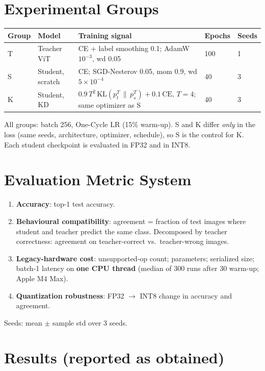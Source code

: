 \documentclass[11pt]{article}
\begin{document}
\section{Experimental Groups}
\begin{center}\small\begin{tabular}{llp{7.6cm}ll}\toprule
Group & Model & Training signal & Epochs & Seeds\\\midrule
T & Teacher ViT & CE + label smoothing 0.1; AdamW $10^{-3}$, wd 0.05 & 100 & 1\\
S & Student, scratch & CE; SGD-Nesterov 0.05, mom 0.9, wd $5\!\times\!10^{-4}$ & 40 & 3\\
K & Student, KD & $0.9\,T^2\,\mathrm{KL}(p_t^{T}\,\|\,p_s^{T}) + 0.1\,\mathrm{CE}$, $T=4$; same optimizer as S & 40 & 3\\\bottomrule
\end{tabular}\end{center}
All groups: batch 256, One-Cycle LR (15\% warm-up). S and K differ \emph{only} in the loss (same seeds,
architecture, optimizer, schedule), so S is the control for K. Each student checkpoint is evaluated in FP32 and in INT8.

\section{Evaluation Metric System}
\begin{enumerate}
  \item \textbf{Accuracy}: top-1 test accuracy.
  \item \textbf{Behavioural compatibility}: agreement = fraction of test images where student and teacher predict the same class.
        Decomposed by teacher correctness: agreement on teacher-correct vs.\ teacher-wrong images.
  \item \textbf{Legacy-hardware cost}: unsupported-op count; parameters; serialized size;
        batch-1 latency on \textbf{one CPU thread} (median of 300 runs after 30 warm-up; Apple M4 Max).
  \item \textbf{Quantization robustness}: FP32 $\rightarrow$ INT8 change in accuracy and agreement.
\end{enumerate}
Seeds: mean $\pm$ sample std over 3 seeds.

\section{Results (reported as obtained)}
\end{document}
